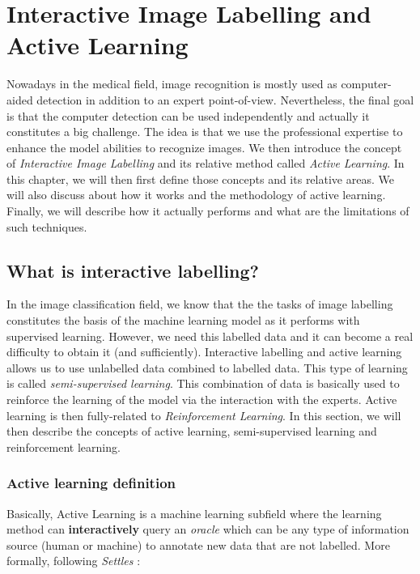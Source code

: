 \documentclass[11pt, openany]{report}
\theoremstyle{plain}
\theoremstyle{definition}
\theoremstyle{remark}
\begin{document}
\chapter{Interactive Image Labelling and Active Learning}


Nowadays in the medical field, image recognition is mostly used as computer-aided detection in addition to an expert point-of-view. Nevertheless, the final goal is that the computer detection can be used independently and actually it constitutes a big challenge. The idea is that we use the professional expertise to enhance the model abilities to recognize images. We then introduce the concept of \textit{Interactive Image Labelling} and its relative method called \textit{Active Learning}. In this chapter, we will then first define those concepts and its relative areas. We will also discuss about how it works and the methodology of active learning. Finally, we will describe how it actually performs and what are the limitations of such techniques. 


\section{What is interactive labelling?}

In the image classification field, we know that the the tasks of image labelling constitutes the basis of the machine learning model as it performs with supervised learning. However, we need this labelled data and it can become a real difficulty to obtain it (and sufficiently). Interactive labelling and active learning allows us to use unlabelled data combined to labelled data. This type of learning is called \textit{semi-supervised learning}. This combination of data is basically used to reinforce the learning of the model via the interaction with the experts. Active learning is then fully-related to \textit{Reinforcement Learning}. In this section, we will then describe the concepts of active learning, semi-supervised learning and reinforcement learning.   


\subsection{Active learning definition}
Basically, Active Learning is a machine learning subfield where the learning method can \textbf{interactively} query an \textit{oracle} which can be any type of information source (human or machine) to annotate new data that are not labelled. More formally, following \textit{Settles} \cite{AL-Survey}: 
\end{document}
